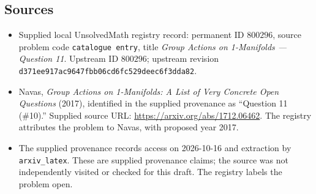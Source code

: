 \documentclass[11pt]{article}
\begin{document}
\subsection{Sources}
\begin{itemize}
\item Supplied local UnsolvedMath registry record: permanent ID \(800296\), source problem code \texttt{catalogue entry}, title \emph{Group Actions on 1-Manifolds --- Question 11}. Upstream ID \(800296\); upstream revision \texttt{d371ee917ac9647fbb06cd6fc529deec6f3dda82}.
\item Navas, \emph{Group Actions on 1-Manifolds: A List of Very Concrete Open Questions} (2017), identified in the supplied provenance as ``Question 11 (\#10).'' Supplied source URL: \url{https://arxiv.org/abs/1712.06462}. The registry attributes the problem to Navas, with proposed year 2017.
\item The supplied provenance records access on 2026-10-16 and extraction by \texttt{arxiv\_latex}. These are supplied provenance claims; the source was not independently visited or checked for this draft. The registry labels the problem open.
\end{itemize}
\end{document}
